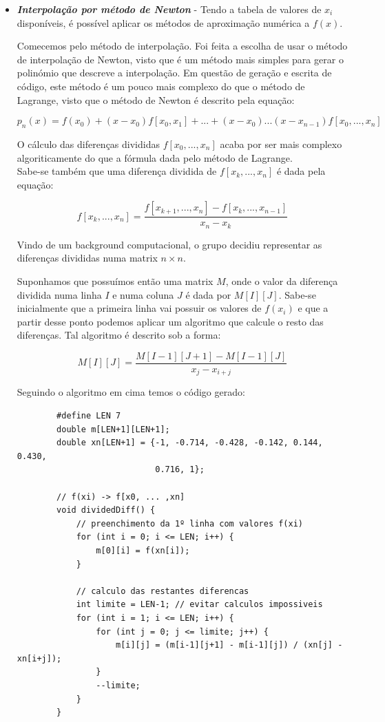 \documentclass[12pt, letterpaper,fleqn]{article}
\begin{document}
\begin{itemize}
    \item \textbf{\textit{Interpolação por método de Newton}} - Tendo a tabela de valores de $x_i$ disponíveis, é possível aplicar os métodos de aproximação numérica a $f(x)$.

    Comecemos pelo método de interpolação. Foi feita a escolha de usar o método de interpolação de Newton, visto que é um método mais simples para gerar o polinómio que descreve a interpolação. Em questão de geração e escrita de código, este método é um pouco mais complexo do que o método de Lagrange, visto que o método de Newton é descrito pela equação:

    \[p_n(x) = f(x_0) + (x-x_0)f[x_0,x_1] + ... + (x-x_0)...(x-x_{n-1})f[x_0, ... , x_n]\]

    O cálculo das diferenças divididas $f[x_0, ... , x_n]$ acaba por ser mais complexo algoriticamente do que a fórmula dada pelo método de Lagrange. \\
    
    Sabe-se também que uma diferença dividida de $f[x_k, ... , x_n]$ é dada pela equação:

    \[f[x_k, ... , x_n] = \frac{f[x_{k+1}, ... , x_n] - f[x_k, ..., x_{n-1}]}{x_n - x_k}\]

    Vindo de um background computacional, o grupo decidiu representar as diferenças divididas numa matrix $n\times n$.

    Suponhamos que possuímos então uma matrix $M$, onde o valor da diferença dividida numa linha $I$ e numa coluna $J$ é dada por $M[I][J]$.
    Sabe-se inicialmente que a primeira linha vai possuir os valores de $f(x_i)$ e que a partir desse ponto podemos aplicar um algoritmo que calcule o resto das diferenças. Tal algoritmo é descrito sob a forma:

    \[M[I][J] = \frac{M[I-1][J+1] - M[I-1][J]}{x_j - x_{i+j}}\]

    Seguindo o algoritmo em cima temos o código gerado:
    \begin{verbatim}
        #define LEN 7
        double m[LEN+1][LEN+1];
        double xn[LEN+1] = {-1, -0.714, -0.428, -0.142, 0.144, 0.430, 
                            0.716, 1};
    
        // f(xi) -> f[x0, ... ,xn]
        void dividedDiff() {
            // preenchimento da 1º linha com valores f(xi)
            for (int i = 0; i <= LEN; i++) {
                m[0][i] = f(xn[i]);
            }
        
            // calculo das restantes diferencas
            int limite = LEN-1; // evitar calculos impossiveis
            for (int i = 1; i <= LEN; i++) {
                for (int j = 0; j <= limite; j++) {
                    m[i][j] = (m[i-1][j+1] - m[i-1][j]) / (xn[j] - xn[i+j]);
                }
                --limite;
            }
        }
    \end{verbatim}


\end{itemize}
\end{document}
